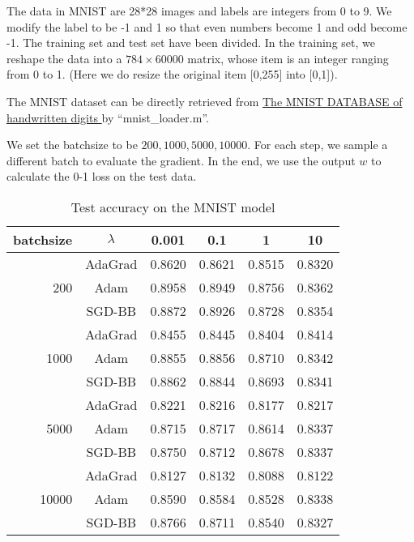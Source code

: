 \documentclass[conference,onecolumn,12pt]{IEEEtran}
\renewcommand{\(}{\left(}
\renewcommand{\)}{\right)}
\numberwithin{equation}{section}
\numberwithin{figure}{section}
\numberwithin{table}{section}
\theoremstyle{definition}
\begin{document}
The data in MNIST are 28*28 images and labels are integers from 0 to 9. We modify the label to be -1 and 1 so that even numbers become 1 and odd become -1. The training set and test set have been divided. In the training set, we reshape the data into a $784\times 60000$ matrix, whose item is an integer ranging from 0 to 1. (Here we do resize the original item [0,255] into [0,1]).

The MNIST dataset can be directly retrieved from \href{http://yann.lecun.com/exdb/mnist/}{The MNIST DATABASE of handwritten digits
} by ``mnist\_loader.m''.

We set the batchsize to be $200,1000,5000,10000$. For each step, we sample a different batch to evaluate the gradient. In the end, we use the output $w$ to calculate the 0-1 loss on the test data.


\begin{table}[!htbp]
\centering
\begin{tabular}{rccccc}
  \toprule
batchsize&$\lambda$& 0.001&0.1&1&10\\
\midrule
\multirow{3}[0]{*}{200} 
&AdaGrad &0.8620&0.8621&0.8515&0.8320 \\
&Adam&0.8958&0.8949&0.8756&0.8362\\
&SGD-BB&0.8872&0.8926&0.8728&0.8354\\

\multirow{3}[0]{*}{1000} 
&AdaGrad &0.8455&0.8445&0.8404&0.8414\\
&Adam&0.8855&0.8856&0.8710&0.8342\\
&SGD-BB&0.8862&0.8844&0.8693&0.8341\\

\multirow{3}[0]{*}{5000} 
&AdaGrad &0.8221&0.8216&0.8177&0.8217\\
&Adam&0.8715&0.8717&0.8614&0.8337\\
&SGD-BB&0.8750&0.8712&0.8678&0.8337\\

\multirow{3}[0]{*}{10000} 
&AdaGrad &0.8127&0.8132&0.8088&0.8122 \\
&Adam&0.8590&0.8584&0.8528&0.8338\\
&SGD-BB&0.8766&0.8711&0.8540&0.8327\\
\bottomrule
\end{tabular}

\caption{Test accuracy on the MNIST model}
\label{tab:acc}

\end{table}
\end{document}
